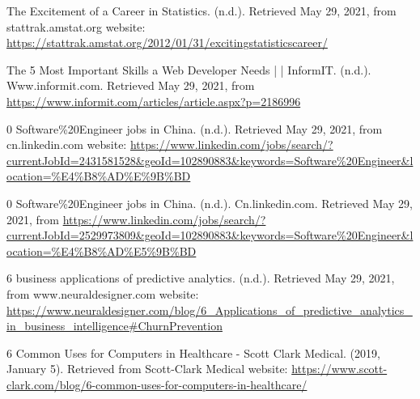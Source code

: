 \documentclass[12pt]{article}
\begin{document}
The Excitement of a Career in Statistics. (n.d.). Retrieved May 29, 2021, from stattrak.amstat.org website:
\url{https://stattrak.amstat.org/2012/01/31/excitingstatisticscareer/}

The 5 Most Important Skills a Web Developer Needs | | InformIT. (n.d.). Www.informit.com. Retrieved May 29, 2021, from
\url{ https://www.informit.com/articles/article.aspx?p=2186996}

0 Software\%20Engineer jobs in China. (n.d.). Retrieved May 29, 2021, from cn.linkedin.com website:
\url{https://www.linkedin.com/jobs/search/?currentJobId=2431581528&geoId=102890883&keywords=Software\%20Engineer&location=\%E4\%B8\%AD\%E\%9B\%BD}

0 Software\%20Engineer jobs in China. (n.d.). Cn.linkedin.com. Retrieved May 29, 2021, from
\url{ https://www.linkedin.com/jobs/search/?currentJobId=2529973809&geoId=102890883&keywords=Software\%20Engineer&location=\%E4\%B8\%AD\%E5\%9B\%BD}

6 business applications of predictive analytics. (n.d.). Retrieved May 29, 2021, from www.neuraldesigner.com website:
\url{https://www.neuraldesigner.com/blog/6\_Applications\_of\_predictive\_analytics\_in\_business\_intelligence#ChurnPrevention}

6 Common Uses for Computers in Healthcare - Scott Clark Medical. (2019, January 5). Retrieved from Scott-Clark Medical website:
\url{https://www.scott-clark.com/blog/6-common-uses-for-computers-in-healthcare/}
\end{document}
